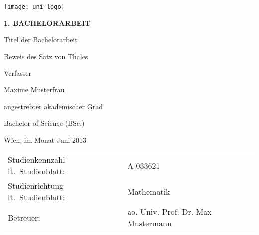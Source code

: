 \begin{titlepage}
\begin{flushright}
    \texttt{[image: uni-logo]}
\end{flushright}
\vspace{1cm}

\begin{center}  %
    \Huge{\textbf{\textsf{\MakeUppercase{
        1. Bachelorarbeit
    }}}}
    \vspace{2cm}

    \large{\textsf{  %
        Titel der Bachelorarbeit
    }}
    \vspace{.1cm}

    \LARGE{\textsf{  Beweis des Satz von Thales
    }}
    \vspace{3cm}

    \large{\textsf{  %
        Verfasser
    }}

    \Large{\textsf{  Maxime Musterfrau
    }}
    \vspace{3cm}

    \large{\textsf{
        angestrebter akademischer Grad  %
    }}

    \Large{\textsf{  %
        Bachelor of Science (BSc.)
    }}
\end{center}
\vspace{2cm}

\noindent\textsf{Wien, im Monat Juni 2013}  %
\vfill

\noindent\begin{tabular}{@{}ll}
\textsf{Studienkennzahl lt.\ Studienblatt:}
&
\textsf{A 033621}  %
\\
\textsf{Studienrichtung lt.\ Studienblatt:}
&
\textsf{Mathematik}  %
\\
\textsf{Betreuer: }
&
\textsf{ao. Univ.-Prof. Dr. Max Mustermann}  %
\end{tabular}

\end{titlepage}